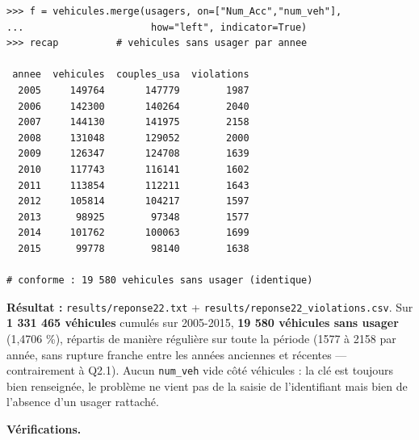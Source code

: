 \documentclass[11pt,a4paper]{article}
\newcommand{\rub}[2]{\textbf{\textcolor{#1}{#2}}}
\begin{document}
\begin{lstlisting}[style=pyblock]
>>> f = vehicules.merge(usagers, on=["Num_Acc","num_veh"],
...                      how="left", indicator=True)
>>> recap          # vehicules sans usager par annee

 annee  vehicules  couples_usa  violations
  2005     149764       147779        1987
  2006     142300       140264        2040
  2007     144130       141975        2158
  2008     131048       129052        2000
  2009     126347       124708        1639
  2010     117743       116141        1602
  2011     113854       112211        1643
  2012     105814       104217        1597
  2013      98925        97348        1577
  2014     101762       100063        1699
  2015      99778        98140        1638

# conforme : 19 580 vehicules sans usager (identique)
\end{lstlisting}

\rub{labresultat}{Résultat :} \texttt{results/reponse22.txt} + \texttt{results/reponse22\_violations.csv}. Sur \textbf{1 331 465 véhicules} cumulés sur 2005-2015, \textbf{19 580 véhicules sans usager} (1,4706 \%), répartis de manière régulière sur toute la période (1577 à 2158 par année, sans rupture franche entre les années anciennes et récentes — contrairement à Q2.1). Aucun \texttt{num\_veh} vide côté véhicules : la clé est toujours bien renseignée, le problème ne vient pas de la saisie de l'identifiant mais bien de l'absence d'un usager rattaché.

\rub{labanalyse}{Vérifications.}
\end{document}
